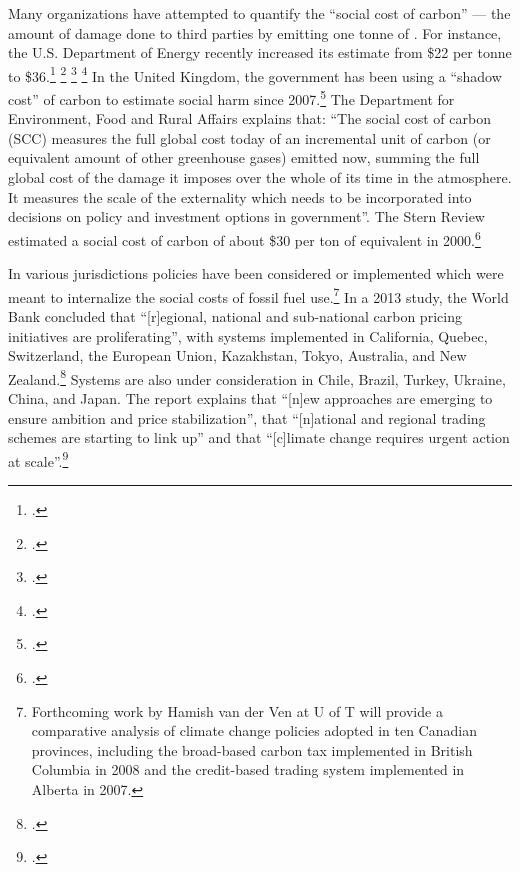 \documentclass[10pt]{article}
\begin{document}
Many organizations have attempted to quantify the ``social cost of carbon'' --- the amount of damage done to third parties by emitting one tonne of .
For instance, the U.S. Department of Energy recently increased its estimate from \$22 per tonne to \$36.\footcite[][]{DOE22to36} \footcite[][]{WHStrengthened} \footcite[See also: ][]{NewSocialCostEffort} \footcite[][]{CBCUSSocialCost}
In the United Kingdom, the government has been using a ``shadow cost'' of carbon to estimate social harm since 2007.\footcite[][]{DEFRAShadowCost}
The Department for Environment, Food and Rural Affairs explains that: ``The social cost of carbon (SCC) measures the full global cost today of an incremental unit of carbon (or equivalent amount of other greenhouse gases) emitted now, summing the full global cost of the damage it imposes over the whole of its time in the atmosphere. It measures the scale of the externality which needs to be incorporated into decisions on policy and investment options in government''.
The Stern Review estimated a social cost of carbon of about \$30 per ton of  equivalent in 2000.\footcite[][]{Stern2007}



In various jurisdictions policies have been considered or implemented which were meant to internalize the social costs of fossil fuel use.\footnote{Forthcoming work by Hamish van der Ven at U of T will provide a comparative analysis of climate change policies adopted in ten Canadian provinces, including the broad-based carbon tax implemented in British Columbia in 2008 and the credit-based trading system implemented in Alberta in 2007.}
In a 2013 study, the World Bank concluded that ``[r]egional, national and sub-national carbon pricing initiatives are proliferating'', with systems implemented in California, Quebec, Switzerland, the European Union, Kazakhstan, Tokyo, Australia, and New Zealand.\footcite[][p. 11]{WorldBankCarbonPricing}
Systems are also under consideration in Chile, Brazil, Turkey, Ukraine, China, and Japan.
The report explains that ``[n]ew approaches are emerging to ensure ambition and price stabilization'', that ``[n]ational and regional trading schemes are starting to link up'' and that ``[c]limate change requires urgent action at scale''.\footcite[][p. 12--13]{WorldBankCarbonPricing}
\end{document}
